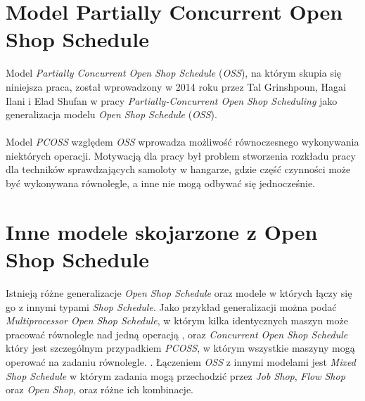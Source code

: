 \documentclass[brudnopis]{xmgr}
\begin{document}
\section{Model Partially Concurrent Open Shop Schedule}
Model \emph{Partially Concurrent Open Shop Schedule} (\emph{OSS}), na którym skupia się niniejsza praca, został wprowadzony w 2014 roku przez Tal Grinshpoun, Hagai Ilani i Elad Shufan w pracy \emph{Partially-Concurrent Open Shop Scheduling} \cite{PCOSS:2014:P} jako generalizacja modelu \emph{Open Shop Schedule} (\emph{OSS}). \\

\medskip\\
Model \emph{PCOSS} względem \emph{OSS} wprowadza możliwość równoczesnego wykonywania niektórych operacji. Motywacją dla pracy był problem stworzenia rozkładu pracy dla techników sprawdzających samoloty w hangarze, gdzie część czynności może być wykonywana równolegle, a inne nie mogą odbywać się jednocześnie.

\section{Inne modele skojarzone z Open Shop Schedule}
Istnieją różne generalizacje \emph{Open Shop Schedule} oraz modele w których łączy się go z innymi typami \emph{Shop Schedule}.
Jako przykład generalizacji można podać \emph{Multiprocessor Open Shop Schedule}, w którym kilka identycznych maszyn może pracować równolegle nad jedną operacją \cite{MPOSS:2020:X}, oraz \emph{Concurrent Open Shop Schedule} który jest szczególnym przypadkiem \emph{PCOSS}, w którym wszystkie maszyny mogą operować na zadaniu równolegle. \cite{OVERLAP:1993:X}.
Łączeniem \emph{OSS} z innymi modelami jest \emph{Mixed Shop Schedule} w którym zadania mogą przechodzić przez \emph{Job Shop}, \emph{Flow Shop} oraz \emph{Open Shop}, oraz różne ich kombinacje.
\end{document}
